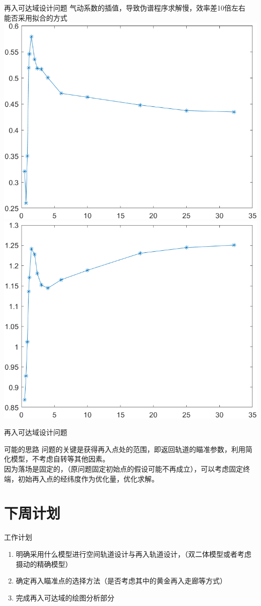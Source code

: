 \documentclass[11pt]{ctexbeamer}
\begin{document}
\begin{frame}{再入可达域设计问题}
	气动系数的插值，导致伪谱程序求解慢，效率差10倍左右\\
	能否采用拟合的方式\\
	\includegraphics[height=.4\textheight]{Ma_Cl.png}
	\includegraphics[height=.4\textheight]{Ma_Cd.png}

\end{frame}
\begin{frame}{再入可达域设计问题}
	\begin{block}{可能的思路}
		问题的关键是获得再入点处的范围，即返回轨道的瞄准参数，利用简化模型，不考虑自转等其他因素。\\
		因为落场是固定的，（原问题固定初始点的假设可能不再成立），可以考虑固定终端，初始再入点的经纬度作为优化量，优化求解。
	\end{block}
\end{frame}
\section{下周计划}
\begin{frame}{工作计划}
	\begin{block}{}
		\begin{enumerate}
			\item 明确采用什么模型进行空间轨道设计与再入轨道设计，（双二体模型或者考虑摄动的精确模型）
			\item 确定再入瞄准点的选择方法（是否考虑其中的黄金再入走廊等方式）
			\item 完成再入可达域的绘图分析部分
		\end{enumerate}
	\end{block}
\end{frame}
\end{document}
